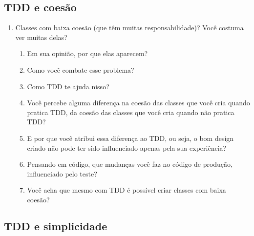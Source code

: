 \subsection{TDD e coesão}
\label{entrevista:coesao}

\begin{enumerate}
	\item{Classes com baixa coesão (que têm muitas responsabilidade)? Você
	costuma ver muitas delas?}
		\begin{enumerate}
			\item Em sua opinião, por que elas aparecem?

			\item Como você combate esse problema?

			\item Como TDD te ajuda nisso?
			
			\item Você percebe alguma diferença na coesão das classes que você cria quando
			pratica TDD, da coesão das classes que você cria quando não pratica TDD?
			
			\item E por que você atribui essa diferença ao TDD, ou seja, o bom design
			criado não pode ter sido influenciado apenas pela sua experiência?
			
			\item Pensando em código, que mudanças você faz no código de produção, influenciado
			pelo teste?

			\item Você acha que mesmo com TDD é possível criar classes com baixa coesão? 

		\end{enumerate}
\end{enumerate}

\subsection{TDD e simplicidade}
\label{entrevista:simplicidade}


